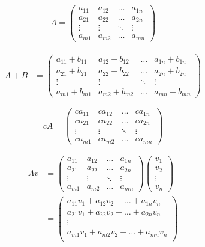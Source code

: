 \documentclass[fleqn,oneside]{article}
\begin{document}
\begin{align*}
A = \left(\begin{array}{cccc}
	a_{11}  &  a_{12} & \ldots  & a_{1n} \\
	a_{21} & a_{22}   & \ldots  & a_{2n} \\
	\vdots &  \vdots   & \ddots  & \vdots \\
	a_{m1}  & a_{m2} & \ldots  & a_{mn} 
\end{array}\right)
\end{align*}

\begin{align*}
A + B &= \left(\begin{array}{ccccc}
	a_{11} + b_{11}  &  a_{12} + b_{12} & \ldots  & a_{1n} +b_{1n}  \\
	a_{21} + b_{21} & a_{22} + b_{22} & \ldots  & a_{2n} + b_{2n} \\
	\vdots &  \vdots   & \ddots  & \vdots \\
	a_{m1}  + b_{m1} & a_{m2} + b_{m2} & \ldots  & a_{mn}  + b_{mn} 
\end{array}\right)
\end{align*}
	
\begin{equation*}
	cA = \left(\begin{array}{cccc}
		ca_{11}  &  ca_{12} & \ldots  & ca_{1n} \\
		ca_{21} & ca_{22}   & \ldots  & ca_{2n} \\
		\vdots &  \vdots   & \ddots  & \vdots \\
		ca_{m1}  & ca_{m2} & \ldots  & ca_{mn} 
	\end{array}\right)
\end{equation*}    

\begin{align*}
Av &= \left(\begin{array}{cccc}
	a_{11}  &  a_{12} & \ldots  & a_{1n} \\
	a_{21} & a_{22}   & \ldots  & a_{2n} \\
	\vdots &  \vdots   & \ddots  & \vdots \\
	a_{m1}  & a_{m2} & \ldots  & a_{mn} 
\end{array}\right)
\left(\begin{array}{ccc}
	v_{1} \\
	v_{2} \\
	\vdots \\
	v_{n} 
\end{array}\right)
\\
&= \left(\begin{array}{ccc}
	a_{11} v_1  +  a_{12} v_2  + \ldots  + a_{1n}v_n \\
	a_{21} v_1  +  a_{22} v_2  + \ldots  + a_{2n}v_n\\
	\vdots \\
	a_{m1} v_1  +  a_{m2} v_2  + \ldots  + a_{mn}v_n\\
\end{array}\right)
\end{align*}
\end{document}
